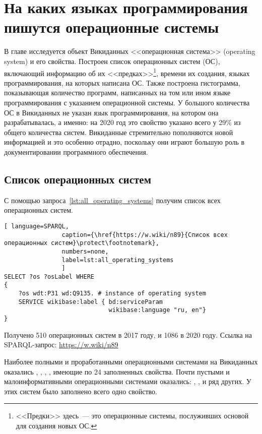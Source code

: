 \chapter{На каких языках программирования пишутся операционные системы}
\label{ch:operating-sysmets}

В главе исследуется объект Викиданных <<операционная система>> (operating system) и его свойства. 
Построен список операционных систем (ОС), включающий информацию об их <<предках>>\footnote{%
%
<<Предки>> здесь~--- это операционные системы, послуживших основой для создания новых ОС.%
%
}, 
времени их создания, языках программирования, на которых написана ОС. 
Также построена гистограмма, показывающая количество программ, написанных на том или ином языке программирования 
с указанием операционной системы. 
У большого количества ОС в Викиданных не указан язык программирования, 
на котором она разрабатывалась, а именно: на 2020 год это свойство указано всего у 29\% из общего количества систем. 
Викиданные стремительно пополняются новой информацией и это особенно отрадно, поскольку они играют большую роль в документировании программного обеспечения.



\section{Список операционных систем}
С помощью запроса~\ref{lst:all_operating_systems} получим список всех операционных систем.


\begin{marginfigure}[-11\baselineskip]
\begin{lstlisting}[ language=SPARQL, 
                caption={\href{https://w.wiki/n89}{Список всех операционных систем}\protect\footnotemark},
                numbers=none,
                label=lst:all_operating_systems
	            ]
SELECT ?os ?osLabel WHERE
{
    ?os wdt:P31 wd:Q9135. # instance of operating system
    SERVICE wikibase:label { bd:serviceParam 
                             wikibase:language "ru, en"}
}
\end{lstlisting}
Получено \num{510} операционных систем в 2017 году, и \num{1086} в 2020 году.  Ссылка на SPARQL-запрос: \href{https://w.wiki/n89}{https://w.wiki/n89}
\end{marginfigure}

Наиболее полными и проработанными операционными системами на Викиданных оказались 
, 
, 
, 
, имеющие по 24 заполненных свойства\autocite{prowd_os_link}.
Почти пустыми и малоинформативными операционными системами оказались: 
, ,  и ряд других. 
У этих систем было заполнено всего одно свойство\autocite{prowd_os_link}.

